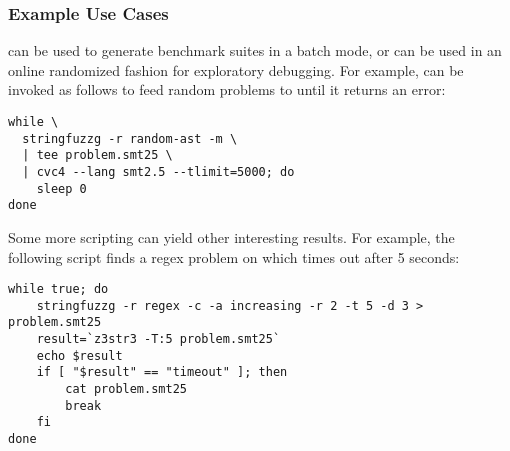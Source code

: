 \subsubsection{Example Use Cases}

\fuzzer{} can be used to
generate benchmark suites in a batch mode, or can be used in an online
randomized fashion for exploratory debugging. For example, \fuzzer{}
can be invoked as follows to feed random problems to \cvc{} until it
returns an error:
{\scriptsize\begin{verbatim}
while \
  stringfuzzg -r random-ast -m \
  | tee problem.smt25 \
  | cvc4 --lang smt2.5 --tlimit=5000; do
    sleep 0
done\end{verbatim}}

Some more \unix{} scripting can yield other interesting results. For
example, the following script finds a regex problem on which \us{}
times out after 5 seconds:
{\scriptsize\begin{verbatim}while true; do
    stringfuzzg -r regex -c -a increasing -r 2 -t 5 -d 3 > problem.smt25
    result=`z3str3 -T:5 problem.smt25`
    echo $result
    if [ "$result" == "timeout" ]; then
        cat problem.smt25
        break
    fi
done\end{verbatim}}
